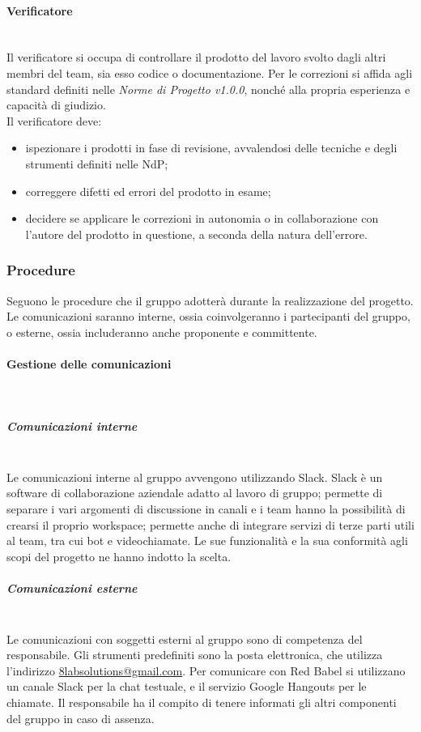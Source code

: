 			\paragraph{Verificatore} \mbox{}\\
			Il verificatore si occupa di controllare il prodotto del lavoro svolto dagli altri membri del team, sia esso codice o documentazione. Per le correzioni si affida agli standard definiti nelle \textit{Norme di Progetto v1.0.0}, nonché alla propria esperienza e capacità di giudizio.\\
			Il verificatore deve:
			\begin{itemize}
				\item ispezionare i prodotti in fase di revisione, avvalendosi delle tecniche e degli strumenti definiti nelle NdP;
				\item correggere difetti ed errori del prodotto in esame;
				\item decidere se applicare le correzioni in autonomia o in collaborazione con l'autore del prodotto in questione, a seconda della natura dell'errore.
			\end{itemize}
		\subsubsection{Procedure}

		Seguono le procedure che il gruppo adotterà durante la realizzazione del progetto. Le comunicazioni saranno interne, ossia coinvolgeranno i partecipanti del gruppo, o esterne, ossia includeranno anche proponente e committente.
			\paragraph{Gestione delle comunicazioni} \mbox{}\\
			\subparagraph{Comunicazioni interne} \mbox{}\\
			Le comunicazioni interne al gruppo avvengono utilizzando Slack. Slack è un software di collaborazione aziendale adatto al lavoro di gruppo; permette di separare i vari argomenti di discussione in canali e i team hanno la possibilità di crearsi il proprio workspace; permette anche di integrare servizi di terze parti utili al team, tra cui bot e videochiamate. Le sue funzionalità e la sua conformità agli scopi del progetto ne hanno indotto la scelta.
			\subparagraph{Comunicazioni esterne} \mbox{}\\
			Le comunicazioni con soggetti esterni al gruppo sono di competenza del responsabile. Gli strumenti predefiniti sono la posta elettronica, che utilizza l'indirizzo \href{mailto:8labsolutions@gmail.com}{8labsolutions@gmail.com}.
			Per comunicare con Red Babel si utilizzano un canale Slack per la chat testuale, e il servizio Google Hangouts per le chiamate. Il responsabile ha il compito di tenere informati gli altri componenti del gruppo in caso di assenza.

